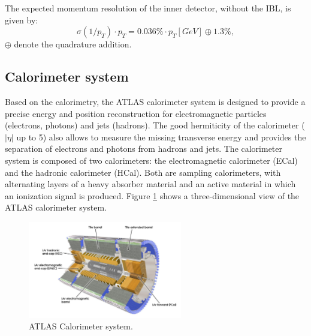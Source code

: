 The expected momentum resolution of the inner detector, without the IBL, is given by:
\begin{equation}
    \sigma(1/p_T)\cdot p_T = 0.036\%\cdot p_T [GeV] \oplus 1.3\%,
\end{equation}
$\oplus$ denote the quadrature addition.

\subsection{Calorimeter system}
\label{chap2:ATLAS:Calo}
Based on the calorimetry, the ATLAS calorimeter system is designed to provide a precise energy and position reconstruction for electromagnetic particles (electrons, photons) and jets (hadrons). The good hermiticity of the calorimeter ($|\eta|$ up to 5) also allows to measure the missing transverse energy and provides the separation of electrons and photons from hadrons and jets. The calorimeter system is composed of two calorimeters: the electromagnetic calorimeter (ECal) and the hadronic calorimeter (HCal). Both are sampling calorimeters, with alternating layers of a heavy absorber material and an active material in which an ionization signal is produced. Figure \ref{fig:chap2:ATLAS:Calo} shows a three-dimensional view of the ATLAS calorimeter system.
\begin{figure}[htbp]
    \centering
    \includegraphics[width=0.6\textwidth]{Ch2/Img/Calo.png}
    \caption{ATLAS Calorimeter system.}
    \label{fig:chap2:ATLAS:Calo}
\end{figure}

